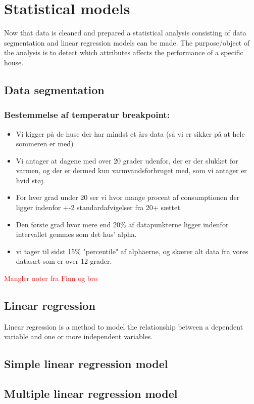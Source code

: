 \chapter{Statistical models}
Now that data is cleaned and prepared a statistical analysis consisting of data segmentation and linear regression models can be made. The purpose/object of the analysis is to detect which attributes affects the performance of a specific house. 

\section{Data segmentation}

\subsection*{Bestemmelse af temperatur breakpoint:}
\begin{itemize}
    \item Vi kigger på de huse der har mindst et års data (så vi er sikker på at hele sommeren er med)
    \item Vi antager at dagene med over 20 grader udenfor, der er der slukket for varmen, og der er dermed kun varmvandsforbruget med, som vi antager er hvid støj.
    \item For hver grad under 20 ser vi hvor mange procent af consumptionen der ligger indenfor +-2 standardafvigelser fra 20+ sættet.
    \item Den første grad hvor mere end 20\% af datapunkterne ligger indenfor intervallet gemmes som det hus' alpha.
    \item vi tager til sidst 15\% "percentile" af alphaerne, og skærer alt data fra vores datasæt som er over 12 grader.
\end{itemize}

\textcolor{red}{Mangler noter fra Finn og bro}

\section{Linear regression}
Linear regression is a method to model the relationship between a dependent variable and one or more independent variables.

\section{Simple linear regression model}

\section{Multiple linear regression model}